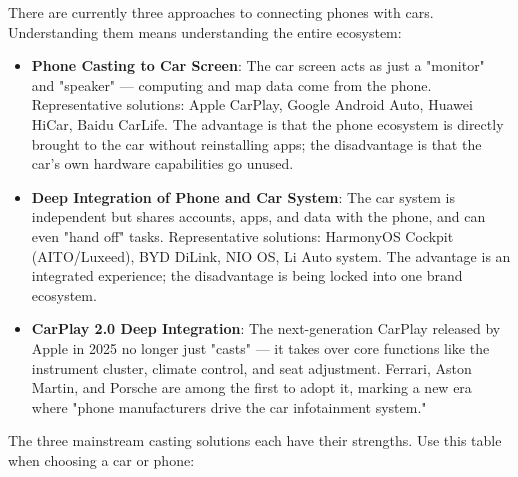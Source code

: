 


There are currently three approaches to connecting phones with cars. Understanding them means understanding the entire ecosystem:

\begin{itemize}
  \item \textbf{Phone Casting to Car Screen}: The car screen acts as just a "monitor" and "speaker" — computing and map data come from the phone. Representative solutions: Apple CarPlay, Google Android Auto, Huawei HiCar, Baidu CarLife. The advantage is that the phone ecosystem is directly brought to the car without reinstalling apps; the disadvantage is that the car's own hardware capabilities go unused.
  \item \textbf{Deep Integration of Phone and Car System}: The car system is independent but shares accounts, apps, and data with the phone, and can even "hand off" tasks. Representative solutions: HarmonyOS Cockpit (AITO/Luxeed), BYD DiLink, NIO OS, Li Auto system. The advantage is an integrated experience; the disadvantage is being locked into one brand ecosystem.
  \item \textbf{CarPlay 2.0 Deep Integration}: The next-generation CarPlay released by Apple in 2025 no longer just "casts" — it takes over core functions like the instrument cluster, climate control, and seat adjustment. Ferrari, Aston Martin, and Porsche are among the first to adopt it, marking a new era where "phone manufacturers drive the car infotainment system."
\end{itemize}


The three mainstream casting solutions each have their strengths. Use this table when choosing a car or phone:

